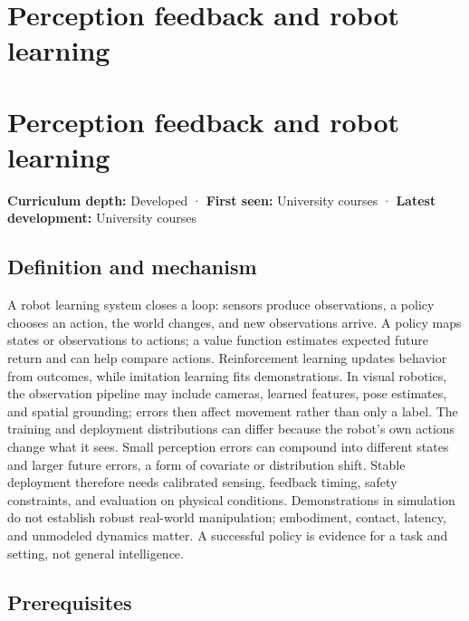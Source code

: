 \hypertarget{appendix-b0c42da325f1}{}
\section*{Perception feedback and robot learning}
\section{Perception feedback and robot learning}\label{appendix-b0c42da325f1-perception-feedback-and-robot-learning}

\textbf{Curriculum depth:} Developed · \textbf{First seen:} University courses · \textbf{Latest development:} University courses

\subsection{Definition and mechanism}\label{appendix-b0c42da325f1-definition-and-mechanism}

A robot learning system closes a loop: sensors produce observations, a policy chooses an action, the world changes, and new observations arrive. A policy maps states or observations to actions; a value function estimates expected future return and can help compare actions. Reinforcement learning updates behavior from outcomes, while imitation learning fits demonstrations. In visual robotics, the observation pipeline may include cameras, learned features, pose estimates, and spatial grounding; errors then affect movement rather than only a label. The training and deployment distributions can differ because the robot's own actions change what it sees. Small perception errors can compound into different states and larger future errors, a form of covariate or distribution shift. Stable deployment therefore needs calibrated sensing, feedback timing, safety constraints, and evaluation on physical conditions. Demonstrations in simulation do not establish robust real-world manipulation; embodiment, contact, latency, and unmodeled dynamics matter. A successful policy is evidence for a task and setting, not general intelligence.

\subsection{Prerequisites}\label{appendix-b0c42da325f1-prerequisites}

